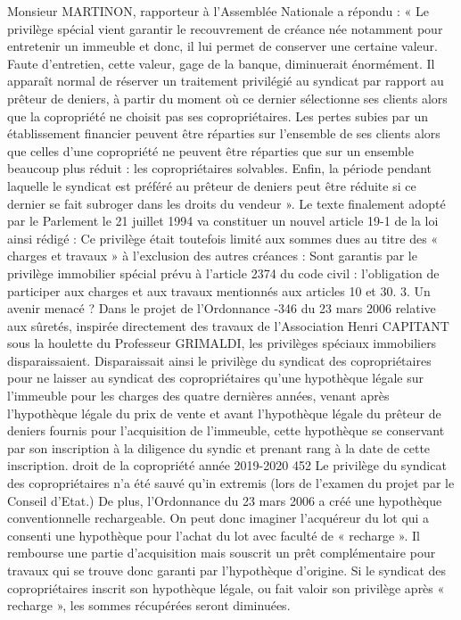 Monsieur MARTINON, rapporteur à l'Assemblée Nationale a répondu :
« Le privilège spécial vient garantir le recouvrement de créance née notamment pour entretenir un immeuble et donc, il lui permet de conserver une certaine valeur.
Faute d'entretien, cette valeur, gage de la banque, diminuerait énormément.
Il apparaît normal de réserver un traitement privilégié au syndicat par rapport au prêteur de deniers, à partir du moment où ce dernier sélectionne ses clients alors que la copropriété ne choisit pas ses copropriétaires.
Les pertes subies par un établissement financier peuvent être réparties sur l'ensemble de ses clients alors que celles d'une copropriété ne peuvent être réparties que sur un ensemble beaucoup plus réduit : les copropriétaires solvables.
Enfin, la période pendant laquelle le syndicat est préféré au prêteur de deniers peut être réduite si ce dernier se fait subroger dans les droits du vendeur ».
Le texte finalement adopté par le Parlement le 21 juillet 1994 va constituer un nouvel article 19-1 de la loi ainsi rédigé :
Ce privilège était toutefois limité aux sommes dues au titre des « charges et travaux » à l’exclusion des autres créances : Sont garantis par le privilège immobilier spécial prévu à l'article 2374 du code civil : l'obligation de participer aux charges et aux travaux mentionnés aux articles 10 et 30.
3. Un avenir menacé ?
Dans le projet de l’Ordonnance -346 du 23 mars 2006 relative aux sûretés, inspirée directement des travaux de l’Association Henri CAPITANT sous la houlette du Professeur GRIMALDI, les privilèges spéciaux immobiliers disparaissaient.
Disparaissait ainsi le privilège du syndicat des copropriétaires pour ne laisser au syndicat des copropriétaires qu’une hypothèque légale sur l’immeuble pour les charges des quatre dernières années, venant après l’hypothèque légale du prix de vente et avant l’hypothèque légale du prêteur de deniers fournis pour l’acquisition de l’immeuble, cette hypothèque se conservant par son inscription à la diligence du syndic et prenant rang à la date de cette inscription.
droit de la copropriété année 2019-2020
452
Le privilège du syndicat des copropriétaires n’a été sauvé qu’in extremis (lors de l’examen du projet par le Conseil d'Etat.)
De plus, l’Ordonnance du 23 mars 2006 a créé une hypothèque conventionnelle rechargeable. On peut donc imaginer l’acquéreur du lot qui a consenti une hypothèque pour l’achat du lot avec faculté de « recharge ». Il rembourse une partie d’acquisition mais souscrit un prêt complémentaire pour travaux qui se trouve donc garanti par l’hypothèque d’origine. Si le syndicat des copropriétaires inscrit son hypothèque légale, ou fait valoir son privilège après « recharge », les sommes récupérées seront diminuées.
